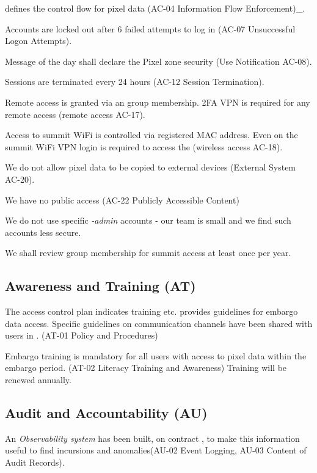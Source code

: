  defines the control flow for pixel data (AC-04  Information Flow Enforcement)_.

Accounts are locked out after 6 failed attempts to log in (AC-07  Unsuccessful Logon Attempts).

Message of the day shall declare the Pixel zone security (Use Notification AC-08).

Sessions are terminated every 24 hours (AC-12  Session Termination).

Remote access is granted via an group membership. 2FA VPN is required for any remote access (remote access AC-17).

Access to summit WiFi is controlled via registered MAC address.
Even on the summit WiFi VPN login is required to access the \PZ (wireless access AC-18).


We do not allow pixel data to be copied to external devices (External System AC-20).

We have no public access (AC-22  Publicly Accessible Content)

We do not use specific \emph{-admin} accounts  - our team is small and we find such accounts less secure.

We shall review group membership for summit access at least once per year.



\subsection{Awareness and Training (AT)} \label{sec:AT}

The access control plan \citep{ACP} indicates training etc.
 provides guidelines for embargo data access.
Specific guidelines on communication channels have been shared with users in .
(AT-01  Policy and Procedures)

Embargo training is mandatory for all users with access to pixel data within the embargo period. (AT-02  Literacy Training and Awareness)
Training will be renewed annually.


\subsection{Audit and Accountability (AU)} \label{sec:AU}
An \emph{Observability system} has been built, on contract , to make this information useful to find incursions and anomalies(AU-02  Event Logging,  AU-03  Content of Audit Records).

